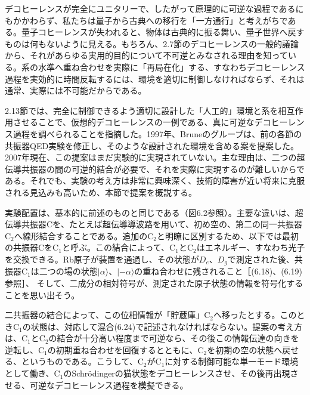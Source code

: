 デコヒーレンスが完全にユニタリーで、したがって原理的に可逆な過程であるにもかかわらず、私たちは量子から古典への移行を「一方通行」と考えがちである。量子コヒーレンスが失われると、物体は古典的に振る舞い、量子世界へ戻すものは何もないように見える。もちろん、2.7節のデコヒーレンスの一般的議論から、それがあらゆる実用的目的について不可逆とみなされる理由を知っている。系の水準へ重ね合わせを実際に「再局在化」する、すなわちデコヒーレンス過程を実効的に時間反転するには、環境を適切に制御しなければならず、それは通常、実際には不可能だからである。

2.13節では、完全に制御できるよう適切に設計した「人工的」環境と系を相互作用させることで、仮想的デコヒーレンスの一例である、真に可逆なデコヒーレンス過程を調べられることを指摘した。1997年、Bruneのグループ\cite{ref254}は、前の各節の共振器QED実験を修正し、そのような設計された環境を含める案を提案した。2007年現在、この提案はまだ実験的に実現されていない。主な理由は、二つの超伝導共振器の間の可逆的結合が必要で、それを実際に実現するのが難しいからである。それでも、実験の考え方は非常に興味深く、技術的障害が近い将来に克服される見込みも高いため、本節で提案を概説する。

実験配置は、基本的に前述のものと同じである（図6.2参照）。主要な違いは、超伝導共振器Cを、たとえば超伝導導波路を用いて、初め空の、第二の同一共振器$\mathrm C_2$へ線形結合することである。追加の$\mathrm C_2$と明瞭に区別するため、以下では最初の共振器Cを$\mathrm C_1$と呼ぶ。この結合によって、$\mathrm C_1$と$\mathrm C_2$はエネルギー、すなわち光子を交換できる。Rb原子が装置を通過し、その状態が$D_e$、$D_g$で測定された後、共振器$\mathrm C_1$は二つの場の状態$|\alpha\rangle$、$|-\alpha\rangle$の重ね合わせに残されること［(6.18)、(6.19)参照］、
\hypertarget{srcpage:256}{}\label{srcpage:256}
そして、二成分の相対符号が、測定された原子状態の情報を符号化することを思い出そう。

二共振器の結合によって、この位相情報が「貯蔵庫」$\mathrm C_2$へ移ったとする。このとき$\mathrm C_1$の状態は、対応して混合(6.24)で記述されなければならない。提案の考え方は、$\mathrm C_1$と$\mathrm C_2$の結合が十分高い程度まで可逆なら、その後この情報伝達の向きを逆転し、$\mathrm C_1$の初期重ね合わせを回復するとともに、$\mathrm C_2$を初期の空の状態へ戻せる、というものである。こうして、$\mathrm C_2$が$\mathrm C_1$に対する制御可能な単一モード環境として働き、$\mathrm C_1$のSchrödingerの猫状態をデコヒーレンスさせ、その後再出現させる、可逆なデコヒーレンス過程を模擬できる。

